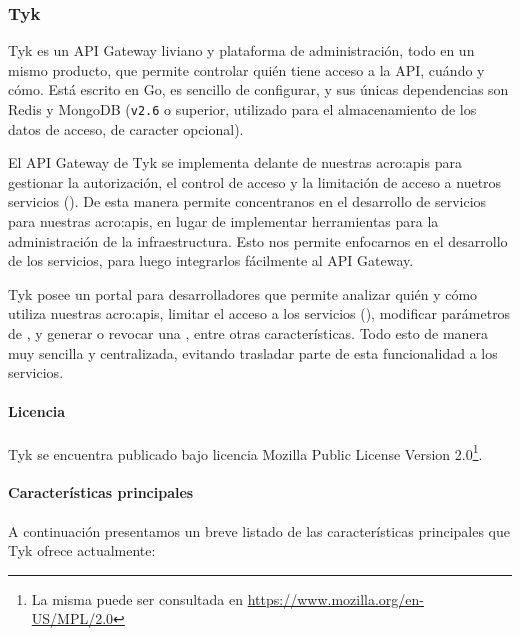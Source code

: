 \subsubsection{Tyk}
\label{soa:tecnologias:tyk}

Tyk es un API Gateway liviano y plataforma de administración, todo en un mismo producto, que permite controlar quién tiene acceso a la API, cuándo y cómo.  Está escrito en Go, es sencillo de configurar, y sus únicas dependencias son Redis y MongoDB (\texttt{v2.6} o superior, utilizado para el almacenamiento de los datos de acceso, de caracter opcional).

El API Gateway de Tyk se implementa delante de nuestras \glspl{acro:api} para gestionar la autorización, el control de acceso y la limitación de acceso a nuetros servicios ().  De esta manera permite concentranos en el desarrollo de servicios para nuestras \glspl{acro:api}, en lugar de implementar herramientas para la administración de la infraestructura.  Esto nos permite enfocarnos en el desarrollo de los servicios, para luego integrarlos fácilmente al API Gateway.

Tyk posee un portal para desarrolladores que permite analizar quién y cómo utiliza nuestras \glspl{acro:api}, limitar el acceso a los servicios (), modificar parámetros de , y generar o revocar una , entre otras características.  Todo esto de manera muy sencilla y centralizada, evitando trasladar parte de esta funcionalidad a los servicios.

\paragraph{Licencia}

Tyk se encuentra publicado bajo licencia Mozilla Public License Version 2.0\footnote{La misma puede ser consultada en \url{https://www.mozilla.org/en-US/MPL/2.0}}.

\paragraph{Características principales}

A continuación presentamos un breve listado de las características principales que Tyk ofrece actualmente:

